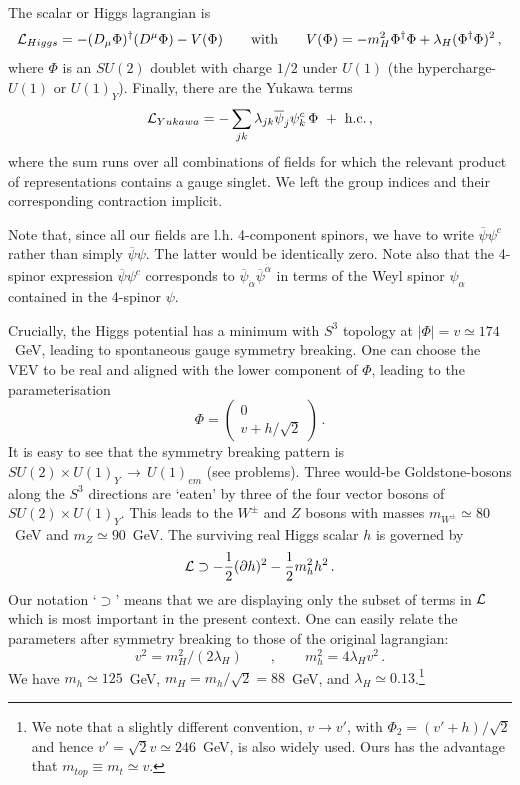 \documentclass[12pt]{article}
\newcommand{\be}{\begin{equation}}
\newcommand{\ee}{\end{equation}}
\newcommand{\ol}{\overline}
\numberwithin{equation}{section}
\begin{document}
The scalar or Higgs lagrangian is 
\be
{\cal L}_{Higgs}=-(D_\mu\Phi)^\dagger(D^\mu\Phi)-V(\Phi)\qquad\mbox{with}\qquad
V(\Phi)=-m_H^2\Phi^\dagger\Phi+\lambda_H(\Phi^\dagger\Phi)^2\,,
\ee
where $\Phi$ is an $SU(2)$ doublet with charge $1/2$ under $U(1)$ (the hypercharge-$U(1)$ or $U(1)_Y$). Finally, there are the Yukawa terms 
\be
{\cal L}_{Yukawa} = -\sum_{jk}\lambda_{jk}\ol{\psi}_j\psi^c_k\,\Phi \,\,+\,\,\mbox{h.c.}\,,
\label{gy}
\ee
where the sum runs over all combinations of fields for which the relevant product of representations contains a gauge singlet. We left the group indices and their corresponding contraction implicit.

Note that, since all our fields are l.h. 4-component spinors, we have to write $\ol{\psi}\psi^c$ rather than simply $\ol{\psi}\psi$. The latter would be identically zero. Note also that the 4-spinor expression $\ol{\psi}\psi^c$ corresponds to $\ol{\psi}_{\dot{\alpha}}\ol{\psi}^{\dot{\alpha}}$ in terms of the Weyl spinor $\psi_\alpha$ contained in the 4-spinor $\psi$. 

Crucially, the Higgs potential has a minimum with $S^3$ topology at $|\Phi|=v\simeq 174$~GeV, leading to spontaneous  gauge symmetry breaking. One can choose the VEV to be real and aligned with the lower component of $\Phi$, leading to the parameterisation
\be
\Phi=\left(\! \begin{array}{l} 0 \\ v+h/\sqrt{2} \end{array}
\!\right)\,.
\ee
It is easy to see that the symmetry breaking pattern is $SU(2)\times U(1)_Y\,\to\, U(1)_{em}$ (see problems). Three would-be Goldstone-bosons along the $S^3$ directions are `eaten' by three of the four vector bosons of $SU(2)\times U(1)_Y$. This leads to the $W^\pm$ and $Z$ bosons with masses $m_{W^\pm}\simeq 80$~GeV and $m_Z\simeq 90$~GeV. The surviving real Higgs scalar $h$ is governed by
\be
{\cal L}\supset -\frac{1}{2}(\partial h)^2-\frac{1}{2}m_h^2 h^2\,.
\ee
Our notation `$\supset$' means that we are displaying only the subset of terms in ${\cal L}$ which is most important in the present context. One can easily relate the parameters after symmetry breaking to those of the original lagrangian:
\be
v^2=m_H^2/(2\lambda_H)\qquad,\qquad m_h^2=4\lambda_H v^2\,.
\ee
We have $m_h\simeq 125$~GeV, $m_H=m_h/\sqrt{2}=88$~GeV, and $\lambda_H\simeq 0.13$.\footnote{We note that a slightly different convention, $v\to v'$,  with $\Phi_2=(v'+h)/\sqrt{2}$ and hence $v'=\sqrt{2}v\simeq 246$~GeV, is also widely used. Ours has the advantage that $m_{top}\equiv m_t\simeq v$.}
\end{document}
